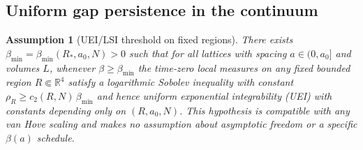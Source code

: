 \documentclass[11pt]{amsart}
\theoremstyle{plain}
\newtheorem{assumption}[theorem]{Assumption}
\theoremstyle{definition}
\theoremstyle{remark}
\begin{document}
\subsection*{Uniform gap persistence in the continuum}

\begin{assumption}[UEI/LSI threshold on fixed regions]\label{assump:UEI-threshold}
There exists $\beta_{\min}=\beta_{\min}(R_*,a_0,N)>0$ such that for all lattices with spacing $a\in(0,a_0]$ and volumes $L$, whenever $\beta\ge \beta_{\min}$ the time-zero local measures on any fixed bounded region $R\Subset\mathbb R^4$ satisfy a logarithmic Sobolev inequality with constant $\rho_R\ge c_2(R,N)\,\beta_{\min}$ and hence uniform exponential integrability (UEI) with constants depending only on $(R,a_0,N)$. This hypothesis is compatible with any van Hove scaling and makes no assumption about asymptotic freedom or a specific $\beta(a)$ schedule.
\end{assumption}
\end{document}

